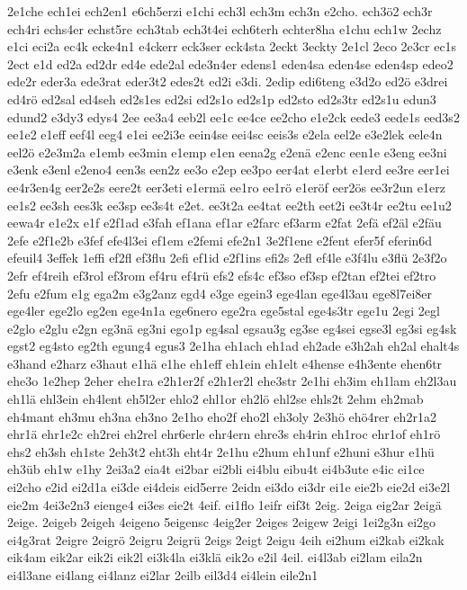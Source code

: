 {2e1che
ech1ei
ech2en1
e6ch5erzi
e1chi
ech3l
ech3m
ech3n
e2cho.
ech3ö2
ech3r
ech4ri
echs4er
echst5re
ech3tab
ech3t4ei
ech6terh
echter8ha
e1chu
ech1w
2echz
e1ci
eci2a
ec4k
ecke4n1
e4ckerr
eck3ser
eck4sta
2eckt
3eckty
2e1cl
2eco
2e3cr
ec1s
2ect
e1d
ed2a
ed2dr
ed4e
ede2al
ede3n4er
edens1
eden4sa
eden4se
eden4sp
edeo2
ede2r
eder3a
ede3rat
eder3t2
edes2t
ed2i
e3di.
2edip
edi6teng
e3d2o
ed2ö
e3drei
ed4rö
ed2sal
ed4seh
ed2s1es
ed2si
ed2s1o
ed2s1p
ed2sto
ed2s3tr
ed2s1u
edun3
edund2
e3dy3
edys4
2ee
ee3a4
eeb2l
ee1c
ee4ce
ee2cho
e1e2ck
eede3
eede1s
eed3s2
ee1e2
e1eff
eef4l
eeg4
e1ei
ee2i3e
eein4se
eei4sc
eeis3s
e2ela
eel2e
e3e2lek
eele4n
eel2ö
e2e3m2a
e1emb
ee3min
e1emp
e1en
eena2g
e2enä
e2enc
een1e
e3eng
ee3ni
e3enk
e3enl
e2eno4
een3s
een2z
ee3o
e2ep
ee3po
eer4at
e1erbt
e1erd
ee3re
eer1ei
ee4r3en4g
eer2e2s
eere2t
eer3eti
e1ermä
ee1ro
ee1rö
e1eröf
eer2ös
ee3r2un
e1erz
ee1s2
ee3sh
ees3k
ee3sp
ee3s4t
e2et.
ee3t2a
ee4tat
ee2th
eet2i
ee3t4r
ee2tu
ee1u2
eewa4r
e1e2x
e1f
e2f1ad
e3fah
ef1ana
ef1ar
e2farc
ef3arm
e2fat
2efä
ef2äl
e2fäu
2efe
e2f1e2b
e3fef
efe4l3ei
ef1em
e2femi
efe2n1
3e2f1ene
e2fent
efer5f
eferin6d
efeuil4
3effek
1effi
ef2fl
ef3flu
2efi
ef1id
e2f1ins
efi2s
2efl
ef4le
e3f4lu
e3flü
2e3f2o
2efr
ef4reih
ef3rol
ef3rom
ef4ru
ef4rü
efs2
efs4c
ef3so
ef3sp
ef2tan
ef2tei
ef2tro
2efu
e2fum
e1g
ega2m
e3g2anz
egd4
e3ge
egein3
ege4lan
ege4l3au
ege8l7ei8er
ege4ler
ege2lo
eg2en
ege4n1a
ege6nero
ege2ra
ege5stal
ege4s3tr
ege1u
2egi
2egl
e2glo
e2glu
e2gn
eg3nä
eg3ni
ego1p
eg4sal
egsau3g
eg3se
eg4sei
egse3l
eg3si
eg4sk
egst2
eg4sto
eg2th
egung4
egus3
2e1ha
eh1ach
eh1ad
eh2ade
e3h2ah
eh2al
ehalt4s
e3hand
e2harz
e3haut
e1hä
e1he
eh1eff
eh1ein
eh1elt
e4hense
e4h3ente
ehen6tr
ehe3o
1e2hep
2eher
ehe1ra
e2h1er2f
e2h1er2l
ehe3str
2e1hi
eh3im
eh1lam
eh2l3au
eh1lä
ehl3ein
eh4lent
eh5l2er
ehlo2
ehl1or
eh2lö
ehl2se
ehls2t
2ehm
eh2mab
eh4mant
eh3mu
eh3na
eh3no
2e1ho
eho2f
eho2l
eh3oly
2e3hö
ehö4rer
eh2r1a2
ehr1ä
ehr1e2c
eh2rei
eh2rel
ehr6erle
ehr4ern
ehre3s
eh4rin
eh1roc
ehr1of
eh1rö
ehs2
eh3sh
eh1ste
2eh3t2
eht3h
eht4r
2e1hu
e2hum
eh1unf
e2huni
e3hur
e1hü
eh3üb
eh1w
e1hy
2ei3a2
eia4t
ei2bar
ei2bli
ei4blu
eibu4t
ei4b3ute
e4ic
ei1ce
ei2cho
e2id
ei2d1a
ei3de
ei4deis
eid5erre
2eidn
ei3do
ei3dr
ei1e
eie2b
eie2d
ei3e2l
eie2m
4ei3e2n3
eienge4
ei3es
eie2t
4eif.
ei1flo
1eifr
eif3t
2eig.
2eiga
eig2ar
2eigä
2eige.
2eigeb
2eigeh
4eigeno
5eigensc
4eig2er
2eiges
2eigew
2eigi
1ei2g3n
ei2go
ei4g3rat
2eigre
2eigrö
2eigru
2eigrü
2eigs
2eigt
2eigu
4eih
ei2hum
ei2kab
ei2kak
eik4am
eik2ar
eik2i
eik2l
ei3k4la
ei3klä
eik2o
e2il
4eil.
ei4l3ab
ei2lam
eila2n
ei4l3ane
ei4lang
ei4lanz
ei2lar
2eilb
eil3d4
ei4lein
eile2n1
}
